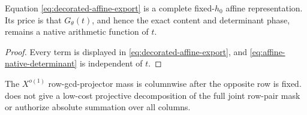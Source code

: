 \begin{corollary}
\label{cor:fixed-h-mask-representation}
Equation \eqref{eq:decorated-affine-export} is a complete
fixed-\(h_0\) affine representation.  Its price is that
\(G_\theta(t)\), and hence the exact content and determinant phase,
remains a native arithmetic function of \(t\).
\end{corollary}

\begin{proof}
Every term is displayed in
\eqref{eq:decorated-affine-export}, and
\eqref{eq:affine-native-determinant} is independent of \(t\).
\end{proof}

\begin{remark}
The \(X^{o(1)}\) row-gcd-projector mass is columnwise after the
opposite row is fixed.   does not
give a low-cost projective decomposition of the full joint row-pair
mask or authorize absolute summation over all columns.
\end{remark}
